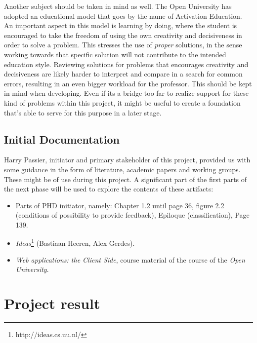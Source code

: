 \documentclass{article}
\begin{document}
Another subject should be taken in mind as well. The Open University has
adopted an educational model that goes by the name of Activation Education. An
important aspect in this model is learning by doing, where the student is
encouraged to take the freedom of using the own creativity and decisiveness in
order to solve a problem. This stresses the use of {\em proper} solutions, in
the sense working towards that specific solution will not contribute to the
intended education style. Reviewing solutions for problems that encourages
creativity and decisiveness are likely harder to interpret and compare in a
search for common errors, resulting in an even bigger workload for the
professor. This should be kept in mind when developing. Even if its a bridge
too far to realize support for these kind of problems within this project, it
might be useful to create a foundation that's able to serve for this purpose in
a later stage.

\subsection{Initial Documentation}

Harry Passier, initiator and primary stakeholder of this project, provided us
with some guidance in the form of literature, academic papers and working
groups. These might be of use during this project. A significant part of the
first parts of the next phase will be used to explore the contents of these
artifacts:
\begin{itemize}
  \item Parts of PHD initiator, namely: Chapter 1.2 until page 36, figure
    2.2 (conditions of possibility to provide feedback), Epiloque
    (classification), Page 139.
  \item {\em Ideas}\footnote{http://ideas.cs.uu.nl/} (Bastiaan Heeren, Alex
    Gerdes).
  \item {\em Web applications: the Client Side}, course material of the course
    of the {\em Open University}.
\end{itemize}

\section{Project result}
% 
\end{document}
